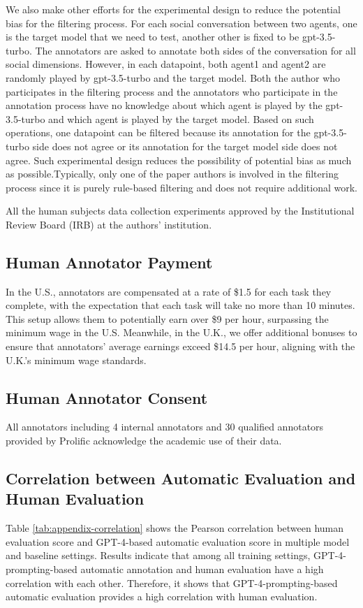 We also make other efforts for the experimental design to reduce the potential bias for the filtering process. For each social conversation between two agents, one is the target model that we need to test, another other is fixed to be gpt-3.5-turbo. The annotators are asked to annotate both sides of the conversation for all social dimensions. However, in each datapoint, both agent1 and agent2 are randomly played by gpt-3.5-turbo and the target model. Both the author who participates in the filtering process and the annotators who participate in the annotation process have no knowledge about which agent is played by the gpt-3.5-turbo and which agent is played by the target model. Based on such operations, one datapoint can be filtered because its annotation for the gpt-3.5-turbo side does not agree or its annotation for the target model side does not agree. Such experimental design reduces the possibility of potential bias as much as possible.Typically, only one of the paper authors is involved in the filtering process since it is purely rule-based filtering and does not require additional work.

All the human subjects data collection experiments approved by the Institutional Review Board (IRB) at the authors’ institution.

\subsection{Human Annotator Payment}
\label{appendix:human-annotator-payment}
In the U.S., annotators are compensated at a rate of \$1.5 for each task they complete, with the expectation that each task will take no more than 10 minutes. This setup allows them to potentially earn over \$9 per hour, surpassing the minimum wage in the U.S. Meanwhile, in the U.K., we offer additional bonuses to ensure that annotators' average earnings exceed \$14.5 per hour, aligning with the U.K.'s minimum wage standards.

\subsection{Human Annotator Consent}
\label{appendix:human-annotator-consent}
All annotators including 4 internal annotators and 30 qualified annotators provided by Prolific acknowledge the academic use of their data.

\subsection{Correlation between Automatic Evaluation and Human Evaluation}
\label{appendix:automatic-and-human-evaluation-correlation}
Table \ref{tab:appendix-correlation} shows the Pearson correlation between human evaluation score and GPT-4-based automatic evaluation score in multiple model and baseline settings. Results indicate that among all training settings, GPT-4-prompting-based automatic annotation and human evaluation have a high correlation with each other. Therefore, it shows that GPT-4-prompting-based automatic evaluation provides a high correlation with human evaluation.


